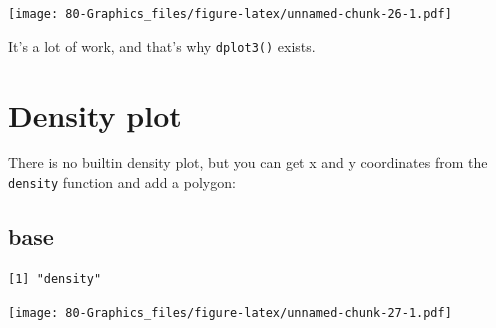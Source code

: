 \documentclass[
]{book}
\newenvironment{Shaded}{\begin{snugshade}}{\end{snugshade}}
\newcommand{\AttributeTok}[1]{\textcolor[rgb]{0.77,0.63,0.00}{#1}}
\newcommand{\FunctionTok}[1]{\textcolor[rgb]{0.00,0.00,0.00}{#1}}
\newcommand{\NormalTok}[1]{#1}
\newcommand{\OtherTok}[1]{\textcolor[rgb]{0.56,0.35,0.01}{#1}}
\newcommand{\SpecialCharTok}[1]{\textcolor[rgb]{0.00,0.00,0.00}{#1}}
\newcommand{\StringTok}[1]{\textcolor[rgb]{0.31,0.60,0.02}{#1}}
\begin{document}
\texttt{[image: 80-Graphics\_files/figure-latex/unnamed-chunk-26-1.pdf]}

It's a lot of work, and that's why \texttt{dplot3()} exists.

\hypertarget{density-plot}{%
\section{Density plot}\label{density-plot}}

There is no builtin density plot, but you can get x and y coordinates from the \texttt{density} function and add a polygon:

\hypertarget{base-3}{%
\subsection{base}\label{base-3}}

\begin{Shaded}
\end{Shaded}

\begin{verbatim}
[1] "density"
\end{verbatim}

\begin{Shaded}
\end{Shaded}

\texttt{[image: 80-Graphics\_files/figure-latex/unnamed-chunk-27-1.pdf]}
\end{document}
